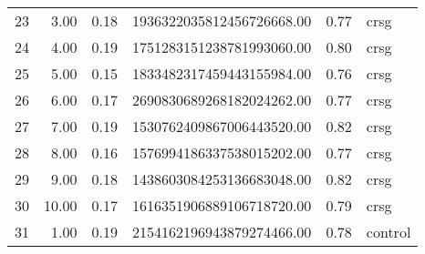\begin{table}[ht]
\begin{tabular}{rrrrrl}
      23 & 3.00 & 0.18 & 1936322035812456726668.00 & 0.77 & crsg \\ 
      24 & 4.00 & 0.19 & 1751283151238781993060.00 & 0.80 & crsg \\ 
      25 & 5.00 & 0.15 & 1833482317459443155984.00 & 0.76 & crsg \\ 
      26 & 6.00 & 0.17 & 2690830689268182024262.00 & 0.77 & crsg \\ 
      27 & 7.00 & 0.19 & 1530762409867006443520.00 & 0.82 & crsg \\ 
      28 & 8.00 & 0.16 & 1576994186337538015202.00 & 0.77 & crsg \\ 
      29 & 9.00 & 0.18 & 1438603084253136683048.00 & 0.82 & crsg \\ 
      30 & 10.00 & 0.17 & 1616351906889106718720.00 & 0.79 & crsg \\ 
      31 & 1.00 & 0.19 & 2154162196943879274466.00 & 0.78 & control \\ 
       \hline
    \end{tabular}
    \end{table}